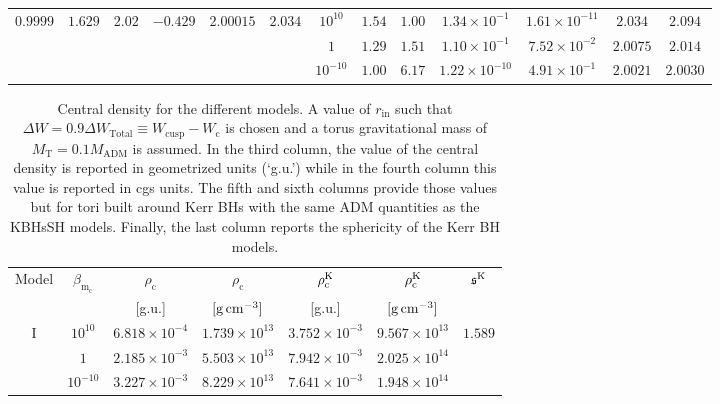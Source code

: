 \documentclass[twocolumn,aps,showpacs,showkeys,prd,superscriptaddress,byrevtex, amsmath]{revtex4-1}
\begin{document}
\begin{table}[t]
\begin{tabular}{c c c c c c  c c c c c c c}
$0.9999$ & $1.629$ & $2.02$ & $-0.429$ & $2.00015$ & $2.034$ & $10^{10}$ & $1.54$ & $1.00$ & $1.34 \times 10^{-1}$ & $1.61 \times 10^{-11}$ & $2.034$ & $2.094$ \\ 

 &  &  &  &  &  & $1$ & $1.29$ & $1.51$ & $1.10 \times 10^{-1}$ & $7.52 \times 10^{-2}$ & $2.0075$ & $2.014$\\ 

 &  &  &  &  &  & $10^{-10}$ & $1.00$ & $6.17$ & $1.22 \times 10^{-10}$ & $4.91 \times 10^{-1}$ & $2.0021$ & $2.0030$ \\ 
\hline\hline
\end{tabular}
\end{table}


\begin{table}[t]
\caption{Central density for the different models. A value of $r_{\mathrm{in}}$ such that $\Delta W = 0.9 \Delta W_{\mathrm{Total}} \equiv W_{\mathrm{cusp}} - W_{\mathrm{c}}$ is chosen and a torus gravitational mass of $M_{\mathrm{T}} = 0.1 M_{\mathrm{ADM}}$ is assumed. In the third column, the value of the central density is reported in geometrized units (`g.u.') while in the fourth column this value is reported in cgs units. The fifth and sixth columns provide those values but for tori built around Kerr BHs with the same ADM quantities as the KBHsSH models. Finally, the last column reports the sphericity of the Kerr BH models.}

\label{density_table}      
\centering          
\begin{tabular}{c c c c c c c}
\hline\hline       
 Model  & $\beta_{\mathrm{m_{\mathrm{c}}}}$ & $\rho_{\mathrm{c}}$ & $\rho_{\mathrm{c}}$ & $\rho^{\rm K}_{\mathrm{c}}$ & $\rho^{\rm K}_{\mathrm{c}}$ & $\mathfrak{s}^{\rm K}$
 \\
 & & [g.u.] & $[\mathrm{g} \, \rm{cm}^{-3}]$ & [g.u.] & $[\mathrm{g} \, \rm{cm}^{-3}]$ & 
  \\ 
\hline           
I  & $10^{10}$ & $6.818 \times 10^{-4}$ & $1.739 \times 10^{13}$  & $3.752 \times 10^{-3}$ &  $9.567 \times 10^{13}$ & $1.589$ \\ 

  & $1$ & $2.185 \times 10^{-3}$ & $5.503 \times 10^{13}$  & $7.942 \times 10^{-3}$ & $2.025 \times 10^{14}$ & \\ 

  & $10^{-10}$ & $3.227 \times 10^{-3}$ & $8.229 \times 10^{13}$  & $7.641 \times 10^{-3}$ & $1.948 \times 10^{14}$ & \\ 


\end{tabular}
\end{table}
\end{document}
